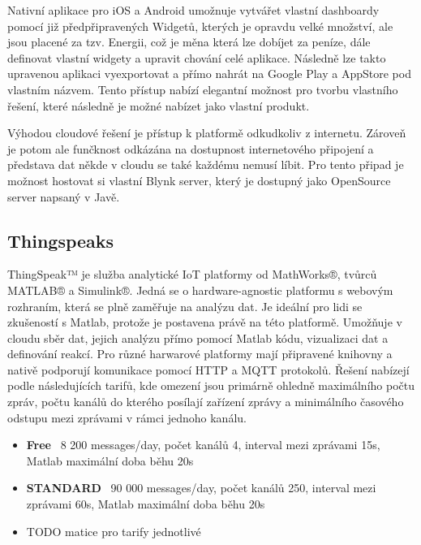 \documentclass[thesis=B,czech]{FITthesis}[2019/12/23]
\begin{document}
Nativní aplikace pro iOS a Android umožnuje vytvářet vlastní dashboardy pomocí již předpřipravených Widgetů, kterých je opravdu velké množství, ale jsou placené za tzv. Energii, což je měna která lze dobíjet za peníze, dále definovat vlastní widgety a upravit chování celé aplikace. Následně lze takto upravenou aplikaci vyexportovat a přímo nahrát na Google Play a AppStore pod vlastním názvem. Tento přístup nabízí elegantní možnost pro tvorbu vlastního řešení, které následně je možné nabízet jako vlastní produkt.

Výhodou cloudové řešení je přístup k platformě odkudkoliv z internetu. Zároveň je potom ale funčknost odkázána na dostupnost internetového připojení a představa dat někde v cloudu se také každému nemusí líbit. Pro tento připad je možnost hostovat si vlastní Blynk server, který je dostupný jako OpenSource server napsaný v Javě. %

\subsection{Thingspeaks}
ThingSpeak™ je služba analytické IoT platformy od MathWorks®, tvůrců MATLAB® a Simulink®. Jedná se o hardware-agnostic platformu s webovým rozhraním, která se plně zaměřuje na analýzu dat. Je ideální pro lidi se zkušeností s Matlab, protože je postavena právě na této platformě. Umožňuje v cloudu sběr dat, jejich analýzu přímo pomocí Matlab kódu, vizualizaci dat a definování reakcí. Pro různé harwarové platformy mají připravené knihovny a nativě podporují komunikace pomocí HTTP a MQTT protokolů. Řešení nabízejí podle následujících tarifů, kde omezení jsou primárně ohledně maximálního počtu zpráv, počtu kanálů do kterého posílají zařízení zprávy a minimálního časového odstupu mezi zprávami v rámci jednoho kanálu.
\begin{itemize}
    \item \textbf{Free} ~8 200 messages/day, počet kanálů 4, interval mezi zprávami 15s, Matlab maximální doba běhu 20s
    \item \textbf{STANDARD} ~90 000 messages/day, počet kanálů 250, interval mezi zprávami 60s, Matlab maximální doba běhu 20s
    \item TODO matice pro tarify jednotlivé
\end{itemize}
\end{document}

